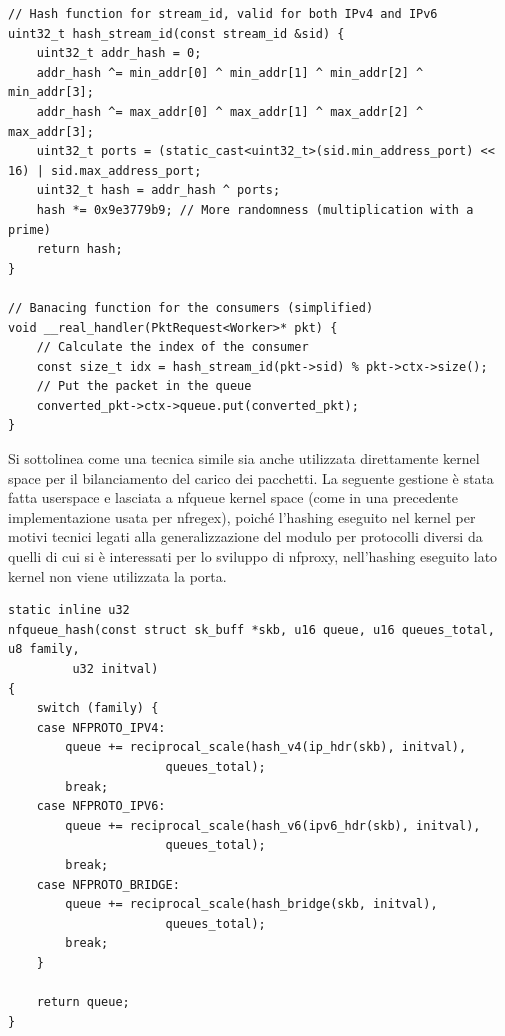 \begin{listing}[H]
    \begin{verbatim}
// Hash function for stream_id, valid for both IPv4 and IPv6
uint32_t hash_stream_id(const stream_id &sid) {
    uint32_t addr_hash = 0;
    addr_hash ^= min_addr[0] ^ min_addr[1] ^ min_addr[2] ^ min_addr[3];
    addr_hash ^= max_addr[0] ^ max_addr[1] ^ max_addr[2] ^ max_addr[3];
    uint32_t ports = (static_cast<uint32_t>(sid.min_address_port) << 16) | sid.max_address_port;
    uint32_t hash = addr_hash ^ ports;
    hash *= 0x9e3779b9; // More randomness (multiplication with a prime)
    return hash;
}

// Banacing function for the consumers (simplified)
void __real_handler(PktRequest<Worker>* pkt) {
    // Calculate the index of the consumer
    const size_t idx = hash_stream_id(pkt->sid) % pkt->ctx->size();
    // Put the packet in the queue
    converted_pkt->ctx->queue.put(converted_pkt);
}
\end{verbatim}
\end{listing}

Si sottolinea come una tecnica simile sia anche utilizzata direttamente kernel space per il bilanciamento del carico dei pacchetti.
La seguente gestione è stata fatta userspace e lasciata a nfqueue kernel space (come in una precedente implementazione usata per nfregex),
poiché l'hashing eseguito nel kernel per motivi tecnici legati alla generalizzazione del modulo per protocolli diversi da quelli di cui
si è interessati per lo sviluppo di nfproxy, nell'hashing eseguito lato kernel non viene utilizzata la porta.

\begin{listing}[H]
    \begin{verbatim}
static inline u32
nfqueue_hash(const struct sk_buff *skb, u16 queue, u16 queues_total, u8 family,
	     u32 initval)
{
	switch (family) {
	case NFPROTO_IPV4:
		queue += reciprocal_scale(hash_v4(ip_hdr(skb), initval),
					  queues_total);
		break;
	case NFPROTO_IPV6:
		queue += reciprocal_scale(hash_v6(ipv6_hdr(skb), initval),
					  queues_total);
		break;
	case NFPROTO_BRIDGE:
		queue += reciprocal_scale(hash_bridge(skb, initval),
					  queues_total);
		break;
	}

	return queue;
}
\end{verbatim}
\end{listing}

